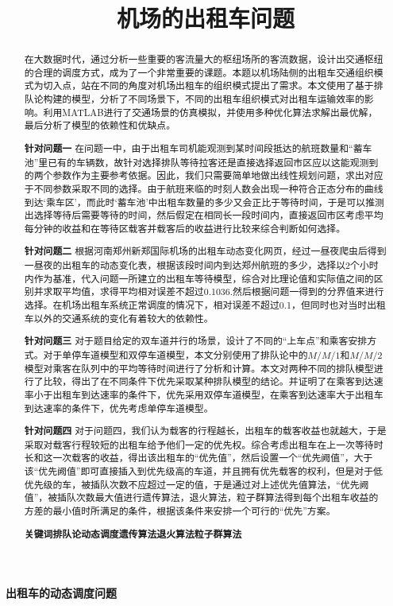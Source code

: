 \documentclass{cumcm}
\title{机场的出租车问题}
\begin{document}
 

\begin{minipage}{0.9\textwidth}
\centering\LARGE\textbf{出租车的动态调度问题}
\end{minipage}

\begin{abstract}
	在大数据时代，通过分析一些重要的客流量大的枢纽场所的客流数据，设计出交通枢纽的合理的调度方式，成为了一个非常重要的课题。本题以机场陆侧的出租车交通组织模式为切入点，站在不同的角度对机场出租车的组织模式提出了需求。本文使用了基于排队论构建的模型，分析了不同场景下，不同的出租车组织模式对出租车运输效率的影响。利用MATLAB进行了交通场景的仿真模拟，并使用多种优化算法求解出最优解，最后分析了模型的依赖性和优缺点。\par
	\textbf{针对问题一}\quad
	在问题一中，由于出租车司机能观测到某时间段抵达的航班数量和“蓄车池”里已有的车辆数，故针对选择排队等待拉客还是直接选择返回市区应以这能观测到的两个参数作为主要参考依据。因此，我们只需要简单地做出线性规划问题，求出对应于不同参数采取不同的选择。由于航班来临的时刻人数会出现一种符合正态分布的曲线到达‘乘车区’，而此时‘蓄车池’中出租车数量的多少又会正比于等待时间，于是可以推测出选择等待后需要等待的时间，然后假定在相同长一段时间内，直接返回市区考虑平均每分钟的收益和在等待区载客并载客后的收益进行比较来综合判断如何选择。\par
	\textbf{针对问题二}\quad
	根据河南郑州新郑国际机场的出租车动态变化网页，经过一昼夜爬虫后得到一昼夜的出租车的动态变化表，根据该段时间内到达郑州航班的多少，选择以2个小时内作为基准，代入问题一所建立的出租车等待模型，综合对比理论值和实际值之间的区别并求取平均值，求得平均相对误差不超过0.1036.然后根据问题一得到的分界值来进行选择。在机场出租车系统正常调度的情况下，相对误差不超过0.1，但同时也对当时出租车以外的交通系统的变化有着较大的依赖性。\par
	\textbf{针对问题三}\quad
	对于题目给定的双车道并行的场景，设计了不同的“上车点”和乘客安排方式。对于单停车道模型和双停车道模型，本文分别使用了排队论中的$M/M/1$和$M/M/2$模型对乘客在队列中的平均等待时间进行了分析和计算。本文对两种不同的排队模型进行了比较，得出了在不同条件下优先采取某种排队模型的结论。并证明了在乘客到达速率小于出租车到达速率的条件下，优先采用双停车道模型，在乘客到达速率大于出租车到达速率的条件下，优先考虑单停车道模型。\par
	\textbf{针对问题四}\quad
	对于问题四，我们认为载客的行程越长，出租车的载客收益也就越大，于是采取对载客行程较短的出租车给予他们一定的优先权。综合考虑出租车在上一次等待时长和这一次载客的收益，得出该出租车的“优先值”，然后设置一个“优先阙值”，大于该“优先阙值”即可直接插入到优先级高的车道，并且拥有优先载客的权利，但是对于低优先级的车，被插队次数不应超过一定的值，于是通过对上述优先值算法，“优先阙值”，被插队次数最大值进行遗传算法，退火算法，粒子群算法得到每个出租车收益的方差的最小值时所满足的条件，根据该条件来安排一个可行的“优先”方案。
\\\par
\textbf{关键词\quad 排队论\quad 动态调度\quad 遗传算法\quad 退火算法\quad 粒子群算法}
\end{abstract}
\end{document}
